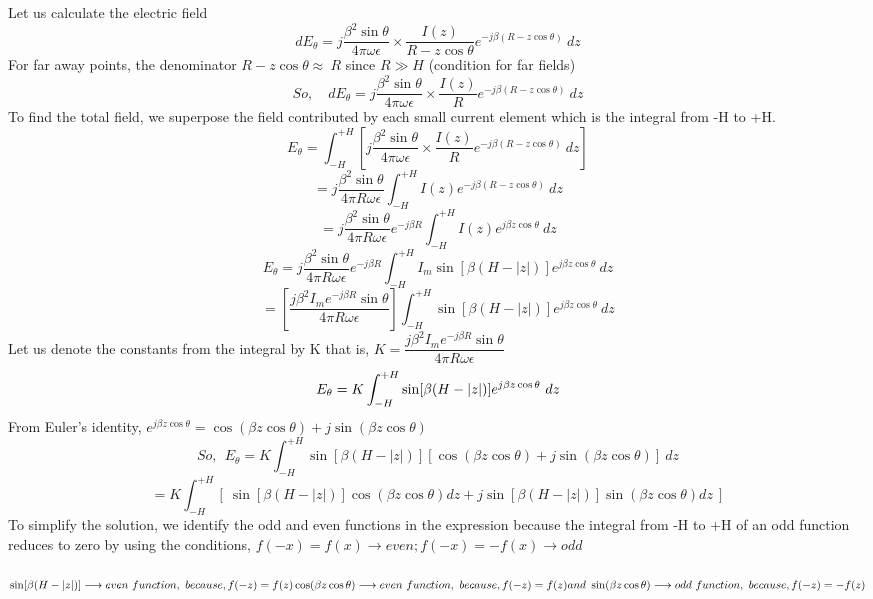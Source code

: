 Let us calculate the electric field
$$
dE_\theta = j\dfrac{\beta^2\sin\theta}{4\pi\omega\epsilon} \times \dfrac{I(z)}{R - z\cos\theta}e^{-j\beta(R - z\cos\theta)}\ dz
$$
For far away points, the denominator $R - z\cos\theta \approx\ R$ since $R \gg H$ (condition for far fields)
$$ So, \quad
dE_\theta = j\dfrac{\beta^2\sin\theta}{4\pi\omega\epsilon} \times \dfrac{I(z)}{R}e^{-j\beta(R - z\cos\theta)}\ dz
$$ 
To find the total field, we superpose the field contributed by each small current element which is the integral from -H to +H.
$$
E_\theta = \int^{+H}_{-H}\left[j\dfrac{\beta^2\sin\theta}{4\pi\omega\epsilon} \times
\dfrac{I(z)}{R}e^{-j\beta(R - z\cos\theta)}\ dz \right]
$$
$$
= j\dfrac{\beta^2\sin\theta}{4\pi R\omega\epsilon}\int^{+H}_{-H}
I(z)e^{-j\beta(R - z\cos\theta)}\ dz
$$
$$
= j\dfrac{\beta^2\sin\theta}{4\pi R\omega\epsilon}e^{-j\beta R}\int^{+H}_{-H}
I(z)e^{j\beta z\cos\theta}\ dz
$$
$$
E_\theta= j\dfrac{\beta^2\sin\theta}{4\pi R\omega\epsilon}e^{-j\beta R}\int^{+H}_{-H}
I_m\sin[\beta(H - |z|)]e^{j\beta z\cos\theta}\ dz
$$
$$
= \left[\dfrac{j\beta^2I_me^{-j\beta R}\sin\theta}{4\pi R\omega\epsilon}\right]\int^{+H}_{-H}
\sin[\beta(H - |z|)]e^{j\beta z\cos\theta}\ dz
$$
Let us denote the constants from the integral by K that is, $K = \dfrac{j\beta^2I_me^{-j\beta R}\sin\theta}{4\pi R\omega\epsilon}$ 
$$
E_\theta = K\int^{+H}_{-H}
\sin[\beta(H - |z|)]e^{j\beta z\cos\theta}\ dz\\
$$
From Euler's identity, $e^{j\beta z\cos\theta} = \cos(\beta z\cos\theta) + j\sin(\beta z\cos\theta)$
\begin{dmath*}
So, \ \ E_\theta = K\int^{+H}_{-H}
\sin[\beta(H - |z|)]\left[\cos(\beta z\cos\theta) + j\sin(\beta z\cos\theta)\right]\ dz
\end{dmath*}
\begin{dmath*}
= K\int^{+H}_{-H}\left[\
\sin[\beta(H - |z|)]\cos(\beta z\cos\theta)dz + j\sin[\beta(H - |z|)]\sin(\beta z\cos\theta)dz \ \right]
\end{dmath*}
To simplify the solution, we identify the odd and even functions in the expression because the integral from -H to +H of an odd function reduces to zero by using the conditions, $f(-x) = f(x)\longrightarrow even; f(-x) = -f(x)\longrightarrow odd$ \\\\
$\sin[\beta(H - |z|)] \longrightarrow even\ function,\ because, f(-z) = f(z)\\\\
\cos(\beta z\cos\theta)\longrightarrow even\ function,\ because, f(-z) = f(z)\\\\ and  \ 
 \sin(\beta z\cos\theta)\longrightarrow odd\ function,\ because, f(-z) = -f(z)
$

